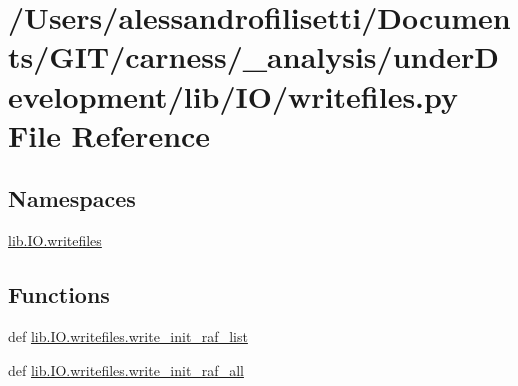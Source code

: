 \hypertarget{a00057}{\section{/\-Users/alessandrofilisetti/\-Documents/\-G\-I\-T/carness/\-\_\-analysis/under\-Development/lib/\-I\-O/writefiles.py File Reference}
\label{a00057}
}
\subsection*{Namespaces}
\begin{DoxyCompactItemize}
\item 
\hyperlink{a00116}{lib.\-I\-O.\-writefiles}
\end{DoxyCompactItemize}
\subsection*{Functions}
\begin{DoxyCompactItemize}
\item 
def \hyperlink{a00116_a33a9a95566de3841055c5dbf7fdc3505}{lib.\-I\-O.\-writefiles.\-write\-\_\-init\-\_\-raf\-\_\-list}
\item 
def \hyperlink{a00116_ad13fc2e762b8deaeb661f939e26e706f}{lib.\-I\-O.\-writefiles.\-write\-\_\-init\-\_\-raf\-\_\-all}
\end{DoxyCompactItemize}
